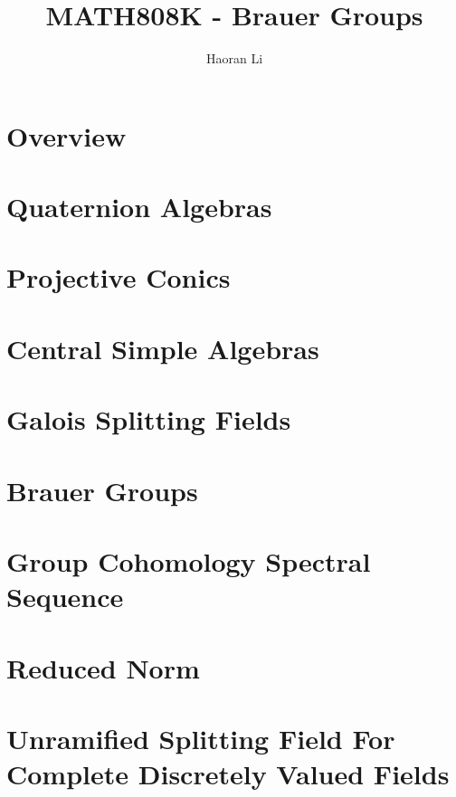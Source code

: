 \documentclass[a4paper,10pt]{article}
\title{MATH808K - Brauer Groups}
\author{Haoran Li}
\begin{document}
\sloppy %

\maketitle
\tableofcontents
\newpage

\section{Overview}


\section{Quaternion Algebras}


\section{Projective Conics}


\section{Central Simple Algebras}


\section{Galois Splitting Fields}


\section{Brauer Groups}


\section{Group Cohomology Spectral Sequence}


\section{Reduced Norm}


\section{Unramified Splitting Field For Complete Discretely Valued Fields}


\begin{thebibliography}{}



\end{thebibliography}

\printindex
\newpage
\end{document}
